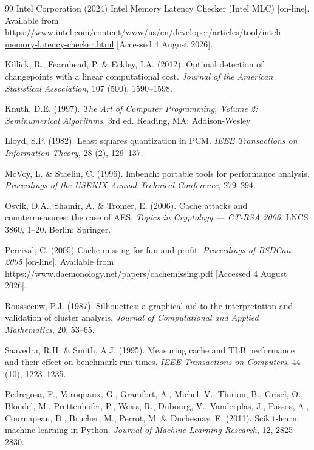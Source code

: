 \documentclass[conference]{IEEEtran}
\begin{document}
\begin{thebibliography}{99}
Intel Corporation (2024) Intel Memory Latency Checker (Intel MLC) [on-line].
Available from \url{https://www.intel.com/content/www/us/en/developer/articles/tool/intelr-memory-latency-checker.html}
[Accessed 4 August 2026].

Killick, R., Fearnhead, P. \& Eckley, I.A. (2012). Optimal detection of
changepoints with a linear computational cost. \textit{Journal of the American
Statistical Association}, 107 (500), 1590--1598.

Knuth, D.E. (1997). \textit{The Art of Computer Programming, Volume 2:
Seminumerical Algorithms}. 3rd ed. Reading, MA: Addison-Wesley.

Lloyd, S.P. (1982). Least squares quantization in PCM. \textit{IEEE Transactions
on Information Theory}, 28 (2), 129--137.

McVoy, L. \& Staelin, C. (1996). lmbench: portable tools for performance
analysis. \textit{Proceedings of the USENIX Annual Technical Conference},
279--294.

Osvik, D.A., Shamir, A. \& Tromer, E. (2006). Cache attacks and countermeasures:
the case of AES. \textit{Topics in Cryptology --- CT-RSA 2006}, LNCS 3860,
1--20. Berlin: Springer.

Percival, C. (2005) Cache missing for fun and profit. \textit{Proceedings of
BSDCan 2005} [on-line]. Available from \url{https://www.daemonology.net/papers/cachemissing.pdf}
[Accessed 4 August 2026].

Rousseeuw, P.J. (1987). Silhouettes: a graphical aid to the interpretation and
validation of cluster analysis. \textit{Journal of Computational and Applied
Mathematics}, 20, 53--65.

Saavedra, R.H. \& Smith, A.J. (1995). Measuring cache and TLB performance and
their effect on benchmark run times. \textit{IEEE Transactions on Computers},
44 (10), 1223--1235.

Pedregosa, F., Varoquaux, G., Gramfort, A., Michel, V., Thirion, B., Grisel, O.,
Blondel, M., Prettenhofer, P., Weiss, R., Dubourg, V., Vanderplas, J., Passos, A.,
Cournapeau, D., Brucher, M., Perrot, M. \& Duchesnay, E. (2011). Scikit-learn:
machine learning in Python. \textit{Journal of Machine Learning Research}, 12,
2825--2830.


\end{thebibliography}
\end{document}
